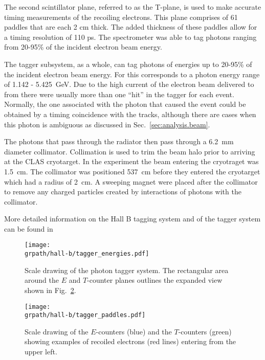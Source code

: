 The second scintillator plane, referred to as the T-plane, is used to make accurate timing measurements of the recoiling electrons. This plane comprises of 61 paddles that are each 2 cm thick. The added thickness of these paddles allow for a timing resolution of 110 ps. The spectrometer was able to tag photons ranging from 20-95\% of the incident electron beam energy.

The tagger subsystem, as a whole, can tag photons of energies up to 20-95\% of the incident electron beam energy. For  this corresponds to a photon energy range of 1.142 - 5.425~GeV. Due to the high current of the electron beam delivered to  from  there were usually more than one ``hit'' in the tagger for each event. Normally, the one associated with the photon that caused the event could be obtained by a timing coincidence with the tracks, although there are cases when this photon is ambiguous as discussed in Sec.~\ref{sec:analysis.beam}.

The photons that pass through the radiator then pass through a 6.2~mm diameter collimator. Collimation is used to trim the beam halo prior to arriving at the CLAS cryotarget. In the  experiment the beam entering the cryotraget was 1.5~cm. The collimator was positioned 537~cm before they entered the cryotarget which had a radius of 2~cm. A sweeping magnet were placed after the collimator to remove any charged particles created by interactions of photons with the collimator.

More detailed information on the Hall B tagging system and  of the tagger system can be found in \cite{clas.tagger}

\begin{figure}\begin{center}
\texttt{[image: \\grpath/hall-b/tagger\_energies.pdf]}
\caption[Tagger Schematic - Energies]{\label{fig:jlab.tagr.energies}Scale drawing of the photon tagger system. The rectangular area around the $E$ and $T$-counter planes outlines the expanded view shown in Fig.~\ref{fig:jlab.tagr.paddles}.}
\end{center}\end{figure}


\begin{figure}\begin{center}
\texttt{[image: \\grpath/hall-b/tagger\_paddles.pdf]}
\caption[Tagger Schematic - Paddles]{\label{fig:jlab.tagr.paddles}{}Scale drawing of the $E$-counters (blue) and the $T$-counters (green) showing examples of recoiled electrons (red lines) entering from the upper left.}
\end{center}\end{figure}
